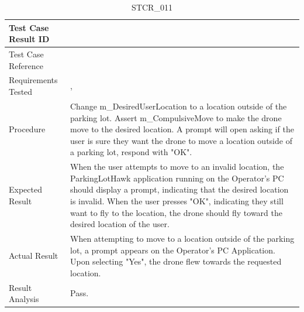 \documentclass[12pt, titlepage]{article}
\begin{document}
\begin{table}[!h]
\begin{center}
\caption {STCR\_011}
\label{tab:STCR_011}
\begin{tabular}{ | m{3.2cm} | m{12.2cm} | } 
\hline
Test Case Result ID & \nameref{tab:STCR_011} \\ 
\hline
Test Case Reference & \nameref{tab:STC_011}  \\ 
\hline
Requirements Tested & \nameref{STA_013}, \nameref{TRANS_005} \\ 
\hline
Procedure & Change m\_DesiredUserLocation to a location outside of the parking lot. Assert m\_CompulsiveMove to make the drone move to the desired location. A prompt will open asking if the user is sure they want the drone to move a location outside of a parking lot, respond with "OK". \\
\hline
Expected Result & When the user attempts to move to an invalid location, the ParkingLotHawk application running on the Operator's PC should display a prompt, indicating that the desired location is invalid. When the user presses "OK", indicating they still want to fly to the location, the drone should fly toward the desired location of the user.  \\ 
\hline
Actual Result & When attempting to move to a location outside of the parking lot, a prompt appears on the Operator's PC Application. Upon selecting "Yes", the drone flew towards the requested location.   \\
\hline
Result Analysis & Pass.  \\ 
\hline
\end{tabular}
\end{center}
\end{table}
\end{document}
